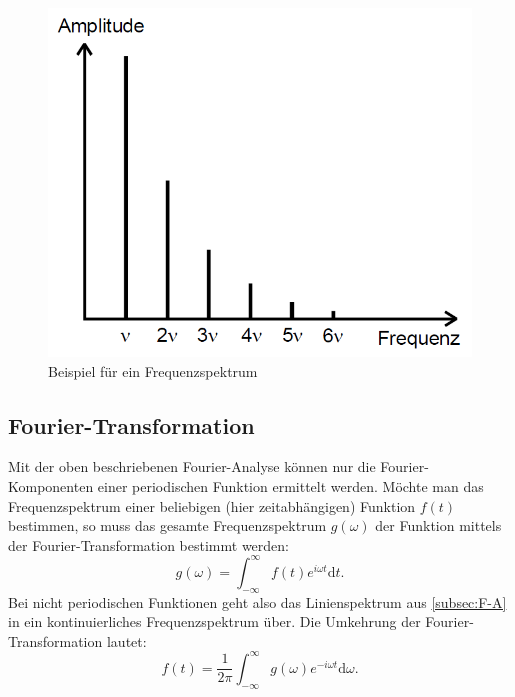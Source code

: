 \begin{figure}
	\centering
	\includegraphics[scale=0.3]{content/images/Spektrum.png}
	\caption{Beispiel für ein Frequenzspektrum\cite{V351}}
	\label{fig:Spektrum}
\end{figure}

\subsection{Fourier-Transformation}\label{F-T}
Mit der oben beschriebenen Fourier-Analyse können nur die Fourier-Komponenten einer periodischen Funktion ermittelt werden. Möchte man das Frequenzspektrum einer beliebigen (hier zeitabhängigen) Funktion $f(t)$ bestimmen, so muss das gesamte Frequenzspektrum $g(\omega)$ der Funktion mittels der Fourier-Transformation bestimmt werden:
\begin{equation}
g(\omega)=\int_{-\infty}^\infty f(t)e^{i\omega t}\mathrm{d}t\text{.}
\end{equation}  
Bei nicht periodischen Funktionen geht also das Linienspektrum aus \ref{subsec:F-A} in ein kontinuierliches Frequenzspektrum über.\newline
Die Umkehrung der Fourier-Transformation lautet:
\begin{equation}
f(t)=\frac{1}{2\pi}\int_{-\infty}^\infty g(\omega)e^{-i\omega t}\mathrm{d}\omega\text{.}
\end{equation}  